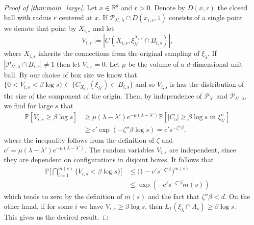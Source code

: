 \documentclass[10pt,a4paper]{amsart}
\renewcommand{\P}{\mathbb{P}}
\newcommand{\reals}{\mathbb{R}}
\begin{document}
\begin{proof}[Proof of \autoref{thm:main_large}]
    Let $x\in\reals^d$ and $r>0$. Denote by $D(x, r)$ the closed ball with radius $r$ centered at $x$. If $\mathcal P_{\lambda', \lambda}\cap D(x_{i,s}, 1)$ consists of a single point we denote that point by $X_{i,s}$ and let
    $$
    V_{i,s}
    :=
    |C
    (X_{i,s}, \mathcal \xi^{X_{i,s}}_{\lambda'}\cap B_{i,s})
    |,
    $$
    where $X_{i,s}$ inherits the connections from the original sampling of $\xi_{\lambda}$.
    If $|\mathcal P_{\lambda', \lambda}\cap B_{i,s}|\neq 1$ then let $V_{i,s} = 0$.
    Let $\mu$ be the volume of a $d$-dimensional unit ball. By our choice of box size we know that $\{0<V_{i,s}<\beta\log s\}\subset\{C_{X_{i,s}}(\xi_{\lambda'})\subset B_{i,s}\}$ and so $V_{i,s}$ is has the distribution of the size of the component of the origin. Then, by independence of $\mathcal P_{\lambda'}$ and $\mathcal P_{\lambda', \lambda}$, we find for large $s$ that
    \begin{align*}
      \P[V_{i,s}\geq \beta \log s]
      & \geq
      \mu (\lambda-\lambda')e^{-\mu(\lambda-\lambda')}
      \P[
        |C_o| \geq \beta\log s
        \text{ in }\xi_{\lambda'}^o
      ]                                                           \\
      & \geq c'\exp(-\zeta''\beta \log s) = c's^{-\zeta''\beta},
    \end{align*}
    where the inequality follows from the definition of $\zeta$ and $c'=\mu(\lambda-\lambda')e^{-\mu(\lambda-\lambda')}$. The random variables $V_{i,s}$ are independent, since they are dependent on configurations in disjoint boxes. It follows that
    \begin{align*}
      \P\Big[
        \bigcap_{i=1}^{m(s)} \{V_{i,s}<\beta\log s\}
      \Big]
      & \leq
      \big(
        1-c's^{-\zeta''\beta}
      \big)^{m(s)}
      \\
      & \leq \exp(-c's^{-\zeta''\beta}m(s))
    \end{align*}
    which tends to zero by the definition of $m(s)$ and the fact that $\zeta''\beta < d$. On the other hand, if for some $i$ we have $V_{i,s}\geq \beta \log s$, then $L_1(\xi_{\lambda}\cap \Lambda_s)\geq \beta \log s$. This gives us the desired result.
  \end{proof}
\end{document}
